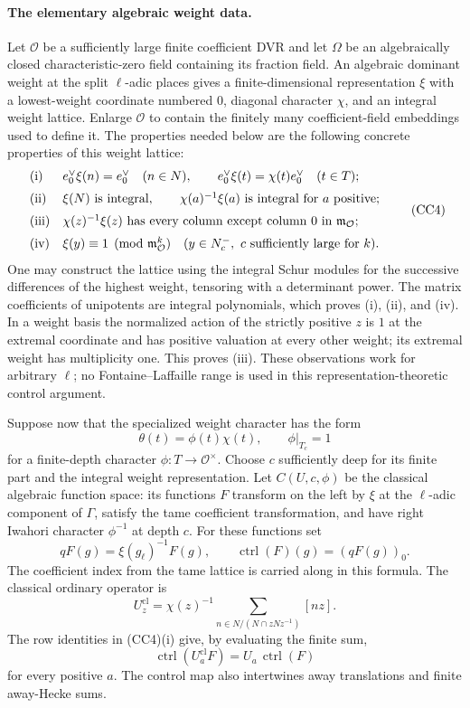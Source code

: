 \paragraph{The elementary algebraic weight data.}
Let \(\mathcal O\) be a sufficiently large finite coefficient DVR
and let \(\Omega\) be an algebraically closed characteristic-zero
field containing its fraction field.
An algebraic dominant weight at the split \(\ell\)-adic places gives
a finite-dimensional representation \(\xi\) with a lowest-weight
coordinate numbered \(0\), diagonal character \(\chi\), and an
integral weight lattice.  Enlarge \(\mathcal O\) to contain the
finitely many coefficient-field embeddings used to define it.
The properties needed below are the following concrete properties
of this weight lattice:
\[
 \begin{array}{ll}
 \text{(i)}&
  e_0^\vee\xi(n)=e_0^\vee\quad(n\in N),\qquad
  e_0^\vee\xi(t)=\chi(t)e_0^\vee\quad(t\in T);\\[2mm]
 \text{(ii)}&
  \xi(N)\ \hbox{is integral},\qquad
  \chi(a)^{-1}\xi(a)\ \hbox{is integral for }a\hbox{ positive};\\[2mm]
 \text{(iii)}&
  \chi(z)^{-1}\xi(z)\ \hbox{has every column except column }0
                     \hbox{ in }\mathfrak m_{\mathcal O};\\[2mm]
 \text{(iv)}&
  \xi(y)\equiv1\pmod{\mathfrak m_{\mathcal O}^k}
   \quad(y\in N^-_c,\ c\hbox{ sufficiently large for }k).
 \end{array}
 \tag{CC4}
\]
One may construct the lattice using the integral Schur modules for
the successive differences of the highest weight, tensoring with
a determinant power.  The matrix coefficients of unipotents are
integral polynomials, which proves (i), (ii), and (iv).
In a weight basis the normalized action of the strictly positive
\(z\) is \(1\) at the extremal coordinate and has positive valuation
at every other weight; its extremal weight has multiplicity one.
This proves (iii).
These observations work for arbitrary \(\ell\); no
Fontaine--Laffaille range is used in this representation-theoretic
control argument.

Suppose now that the specialized weight character has the form
\[
 \theta(t)=\phi(t)\chi(t),\qquad \phi|_{T_c}=1
 \tag{CC5}
\]
for a finite-depth character \(\phi:T\to\mathcal O^\times\).
Choose \(c\) sufficiently deep for its finite part and the integral
weight representation.
Let \(C(U,c,\phi)\) be the classical algebraic function space:
its functions \(F\) transform on the left by \(\xi\) at the
\(\ell\)-adic component of \(\Gamma\), satisfy the tame coefficient
transformation, and have right Iwahori character \(\phi^{-1}\)
at depth \(c\).
For these functions set
\[
 qF(g)=\xi(g_\ell)^{-1}F(g),\qquad
 \operatorname{ctrl}(F)(g)=(qF(g))_0 .
 \tag{CC6}
\]
The coefficient index from the tame lattice is carried along in
this formula.  The classical ordinary operator is
\[
 U_z^{\mathrm{cl}}=
   \chi(z)^{-1}\sum_{n\in N/(N\cap zNz^{-1})}[nz].
 \tag{CC7}
\]
The row identities in (CC4)(i) give, by evaluating the finite sum,
\[
 \operatorname{ctrl}(U_a^{\mathrm{cl}}F)
        =U_a\,\operatorname{ctrl}(F)
 \tag{CC8}
\]
for every positive \(a\).  The control map also intertwines away
translations and finite away-Hecke sums.

